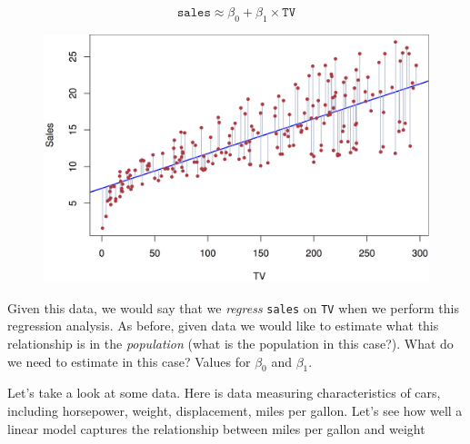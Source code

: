 \documentclass[]{article}
\newenvironment{Shaded}{\begin{snugshade}}{\end{snugshade}}
\newcommand{\KeywordTok}[1]{\textcolor[rgb]{0.13,0.29,0.53}{\textbf{{#1}}}}
\newcommand{\DataTypeTok}[1]{\textcolor[rgb]{0.13,0.29,0.53}{{#1}}}
\newcommand{\StringTok}[1]{\textcolor[rgb]{0.31,0.60,0.02}{{#1}}}
\newcommand{\NormalTok}[1]{{#1}}
\theoremstyle{definition}
\theoremstyle{definition}
\theoremstyle{remark}
\begin{document}
\[
\mathtt{sales} \approx \beta_0 + \beta_1 \times \mathtt{TV}
\]

\begin{figure}[htbp]
\centering
\includegraphics{img/regression_example.png}
\caption{}
\end{figure}

Given this data, we would say that we \emph{regress} \texttt{sales} on
\texttt{TV} when we perform this regression analysis. As before, given
data we would like to estimate what this relationship is in the
\emph{population} (what is the population in this case?). What do we
need to estimate in this case? Values for \(\beta_0\) and \(\beta_1\).

Let's take a look at some data. Here is data measuring characteristics
of cars, including horsepower, weight, displacement, miles per gallon.
Let's see how well a linear model captures the relationship between
miles per gallon and weight

\begin{Shaded}
\end{Shaded}
\end{document}
